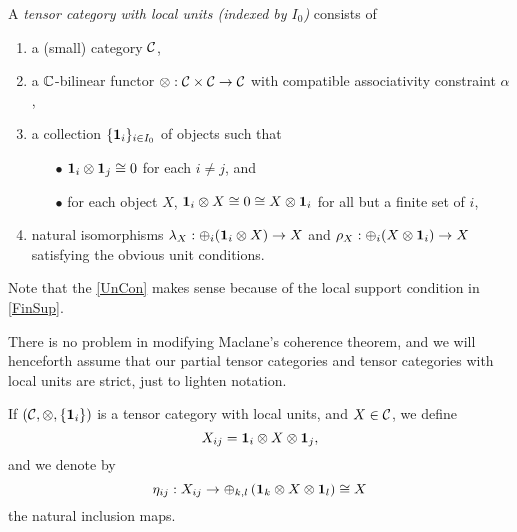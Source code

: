 \begin{Def} A \emph{tensor category with local units (indexed by $I_0$)} consists of
\begin{enumerate}[label=(\alph*)]
\item a (small) category $\mathcal{C}$, 
\item a $\mathbb{C}$-bilinear functor $\otimes: \mathcal{C}\times \mathcal{C} \rightarrow \mathcal{C}$ with compatible associativity constraint $\alpha$, 
\item\label{FinSup} a collection $\{\mathbf{1}_i\}_{i\in I_0}$ of objects such that 
\begin{itemize}\item[$\bullet$] $\mathbf{1}_i\otimes \mathbf{1}_j \cong 0$ for each $i\neq j$, and
\item[$\bullet$] for each object $X$,  $\mathbf{1}_i\otimes X \cong 0 \cong X\otimes \mathbf{1}_i$ for all but a finite set of $i$,
\end{itemize}
\item\label{UnCon} natural isomorphisms $\lambda_X:\oplus_i (\mathbf{1}_i\otimes X) \rightarrow X$ and $\rho_X:\oplus_i(X\otimes \mathbf{1}_i)\rightarrow X$ satisfying the obvious unit conditions. 
\end{enumerate} 
\end{Def}


Note that the \eqref{UnCon} makes sense because of the local support condition in \eqref{FinSup}. 

\begin{Rem} There is no problem in modifying Maclane's coherence theorem, and we will henceforth assume that our partial tensor categories and tensor categories with local units are strict, just to lighten notation. 
\end{Rem}

\begin{Not} If $(\mathcal{C},\otimes,\{\mathbf{1}_i\})$ is a tensor category with local units, and $X\in \mathcal{C}$, we define \[X_{ij} = \mathbf{1}_i\otimes X \otimes \mathbf{1}_j,\] and we denote by \[\eta_{ij}:X_{ij} \rightarrow \oplus_{k,l} \left(\mathbf{1}_k \otimes X \otimes \mathbf{1}_l\right) \cong X\] the natural inclusion maps. %
\end{Not}



